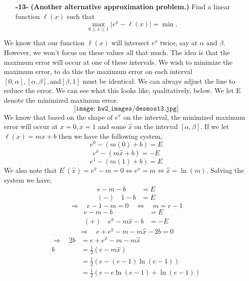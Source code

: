 \documentclass[11pt]{article}
\theoremstyle{definition}
\newcommand{\1}[1]{\mathbf{1} \left \{ #1 \right \}}
\begin{document}
\begin{itemize}
    \item[{\textbf{-13-}}] \textbf{(Another alternative approximation problem.)}  Find a linear function $\ell(x)$ such that
    \begin{equation}
        \max_{0 \leq x \leq 1} |e^x - \ell(x)| = \min.
    \end{equation}
\end{itemize}
We know that our function $\ell(x)$ will intersect $e^x$ twice, say at $\alpha$ and $\beta$.  However, we won't focus on these values all that much.  The idea is that the maximum error will occur at one of these intervals.  We wish to minimize the maximum error, to do this the maximum error on each interval \([0, \alpha], [\alpha, \beta], \text{and} [\beta, 1]\) must be identical.  We can always adjust the line to reduce the error.  We can see what this looks like, qualitatively, below.  We let E denote the minimized maximum error.
\[\texttt{[image: hw2\_images/desmos13.jpg]}\]
We know that based on the shape of $e^x$ on the interval, the minimized maximum error will occur at $x=0, x=1$ and some $\hat{x}$ on the interval $[\alpha, \beta]$.  If we let $\ell(x) = mx+b$ then we have the following system,
\[e^0 - (m(0) + b) = E\]
\[e^{\hat{x}} - (m\hat{x} + b) = -E\]
\[e^1 - (m(1) + b) = E\]
We also note that \(E^{\prime}(\hat{x}) = e^{\hat{x}} - m = 0 \Leftrightarrow e^{\hat{x}} = m \Leftrightarrow \hat{x} = \ln (m)\).  Solving the system we have,
\begin{align*}
    e - m - b &= E \\
    (-) \quad 1 - b &= E
\end{align*}
\[\Longrightarrow \quad e - 1 - m = 0 \quad \Longleftrightarrow \quad m = e - 1\]
\begin{align*}
    e - m - b &= E \\
    (+) \quad e^{\hat{x}} - m\hat{x} - b &= -E
\end{align*}
\[\Longrightarrow \quad e + e^{\hat{x}} - m - m\hat{x} - 2b = 0 \]
\begin{equation*}
    \begin{split}
        \Longrightarrow \quad 2b &= e + e^{\hat{x}} - m - m\hat{x} \\
        b &= \frac{1}{2}\left(e - m\hat{x}\right) \\
        &= \frac{1}{2}\left(e - (e - 1)\ln(e - 1)\right) \\
        &= \frac{1}{2}\left(e - e\ln(e - 1) + \ln(e - 1)\right)
    \end{split}
\end{equation*}
\end{document}
